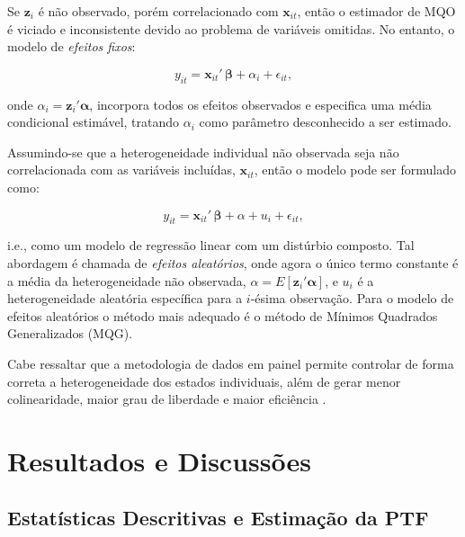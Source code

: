 \documentclass[
  12pt,
  a4paper,
  oneside,
  brazil,
  chapter=TITLE,
  section=TITLE
]{abntex2}
\begin{document}
Se $\mathbf{z}_i$ é não observado, porém correlacionado com $\mathbf{x}_{it}$, então o estimador de MQO é viciado e inconsistente devido ao problema de variáveis omitidas. No entanto, o modelo de \textit{efeitos fixos}:

\begin{equation}
  y_{it} = \mathbf{x}_{it}'\,\boldsymbol{\beta} + \alpha_i + \epsilon_{it},
  \label{eq:fixed_effects}
\end{equation}

\noindent onde $\alpha_i = \mathbf{z}_i'\boldsymbol{\alpha}$, incorpora todos os efeitos observados e especifica uma média condicional estimável, tratando $\alpha_i$ como parâmetro desconhecido a ser estimado.

Assumindo-se que a heterogeneidade individual não observada seja não correlacionada com as variáveis incluídas, $\mathbf{x}_{it}$, então o modelo pode ser formulado como:

\begin{equation}
  y_{it} = \mathbf{x}_{it}'\,\boldsymbol{\beta} + \alpha + u_i + \epsilon_{it},
  \label{eq:random_effects}
\end{equation}

\noindent i.e., como um modelo de regressão linear com um distúrbio composto. Tal abordagem é chamada de \textit{efeitos aleatórios}, onde agora o único termo constante é a média da heterogeneidade não observada, $\alpha = E[\mathbf{z}_i'\boldsymbol{\alpha}]$, e $u_i$ é a heterogeneidade aleatória específica para a $i$-ésima observação. Para o modelo de efeitos aleatórios o método mais adequado é o método de Mínimos Quadrados Generalizados (MQG).

Cabe ressaltar que a metodologia de dados em painel permite controlar de forma correta a heterogeneidade dos estados individuais, além de gerar menor colinearidade, maior grau de liberdade e maior eficiência \cite{tavares2001}.

\chapter{Resultados e Discussões}

\section{Estatísticas Descritivas e Estimação da PTF}
\end{document}

